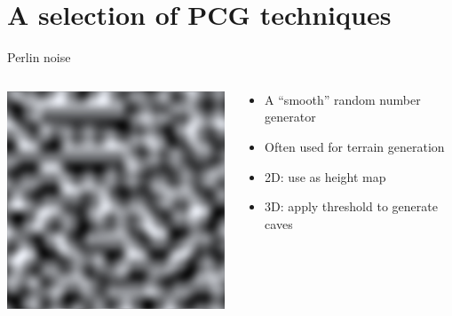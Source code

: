 \part{A selection of PCG techniques}
\frame{\partpage}


\begin{frame}{Perlin noise}
	\begin{columns}
		\begin{column}{0.4\textwidth}
			\includegraphics[width=\textwidth]{perlin}
		\end{column}
		\begin{column}{0.55\textwidth}
			\begin{itemize}
                \pause\item A ``smooth'' random number generator
                \pause\item Often used for terrain generation
                \pause\item 2D: use as height map
                \pause\item 3D: apply threshold to generate caves
			\end{itemize}
		\end{column}
	\end{columns}
\end{frame}


